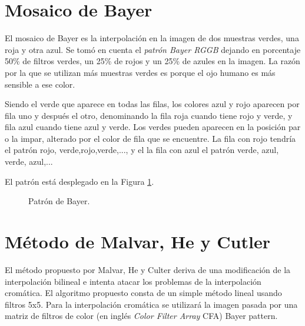 \cite{extra2}


\section{Mosaico de Bayer\cite{Bayer}}
El mosaico de Bayer es la interpolación en la imagen de dos muestras verdes, una roja y otra azul. Se tomó en cuenta el \textit{patrón Bayer RGGB} dejando en porcentaje 50\% de filtros verdes, un 25\% de rojos y un 25\% de azules en la imagen. La razón por la que se utilizan más muestras verdes es porque el ojo humano es más sensible a ese color.

Siendo el verde que aparece en todas las filas, los colores azul y rojo aparecen por fila uno y después el otro, denominando la fila roja cuando tiene rojo y verde, y fila azul cuando tiene azul y verde. Los verdes pueden aparecen en la posición par o la impar, alterado por el color de fila que se encuentre.
La fila con rojo tendría el patrón rojo, verde,rojo,verde,..., y el la fila con azul el patrón verde, azul, verde, azul,...

El patrón está desplegado en la Figura \ref{fBayer}.

\begin{figure}[h]
  \centering
  \centering
  \caption{Patrón de Bayer.}
  \label{fBayer}
\end{figure}

\section{Método de Malvar, He y Cutler}\label{capMalvar}
El método propuesto por Malvar, He y Culter deriva de una modificación de la interpolación bilineal e intenta atacar los problemas de la interpolación cromática. El algoritmo propuesto consta de un simple método lineal usando filtros 5x5. Para la interpolación cromática se utilizará la imagen pasada por una matriz de filtros de color (en inglés \textit{Color Filter Array} CFA) Bayer pattern\cite{Bayer}.

